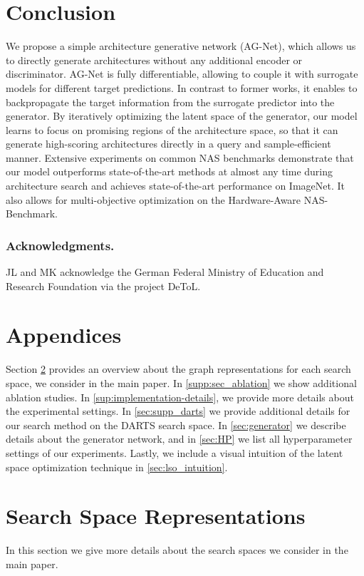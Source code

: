 \documentclass[runningheads]{llncs}
\begin{document}
\section{Conclusion}
We propose a simple architecture generative network (AG-Net), which allows us to directly generate architectures without any additional encoder or discriminator. AG-Net is fully differentiable, allowing to couple it with surrogate models for different target predictions.
In contrast to former works, it enables to backpropagate the target information from the surrogate predictor into the generator.
By iteratively optimizing the latent space of the generator, our model learns to focus on promising regions of the architecture space, so that it can generate high-scoring architectures directly in a query and sample-efficient manner.
Extensive experiments on common NAS benchmarks demonstrate that our model outperforms state-of-the-art methods at almost any time during architecture search and achieves state-of-the-art performance on ImageNet.
It also allows for multi-objective optimization on the Hardware-Aware NAS-Benchmark.

\subsubsection{Acknowledgments.}
JL and MK acknowledge the German Federal Ministry of Education and Research Foundation via the project DeToL.





\onecolumn
\newpage
\appendix
\section*{Appendices}

Section \ref{sup:sp-representations} provides an overview about the graph representations for each search space, we consider in the main paper.
In \autoref{supp:sec_ablation} we show additional ablation studies.
In \autoref{sup:implementation-details}, we provide more details about the experimental settings. In \autoref{sec:supp_darts} we provide additional details for our search method on the DARTS search space.
In \autoref{sec:generator} we describe details about the generator network, and in \autoref{sec:HP} we list all hyperparameter settings of our experiments.
Lastly, we include a visual intuition of the latent space optimization technique in \autoref{sec:lso_intuition}.

\section{Search Space Representations}\label{sup:sp-representations}
In this section we give more details about the search spaces we consider in the main paper. 
\end{document}
